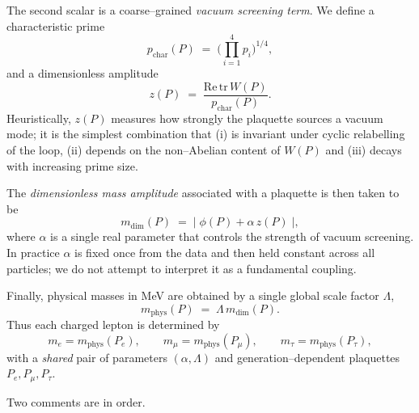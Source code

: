 \documentclass[12pt]{article}
\begin{document}
The second scalar is a coarse--grained \emph{vacuum screening term}.
We define a characteristic prime
\begin{equation}
  p_{\mathrm{char}}(P)
    \;=\; \biggl(\prod_{i=1}^{4} p_i\biggr)^{1/4},
  \label{eq:pchar}
\end{equation}
and a dimensionless amplitude
\begin{equation}
  z(P)
    \;=\; \frac{\mathrm{Re}\,\mathrm{tr}\,W(P)}{p_{\mathrm{char}}(P)}.
  \label{eq:zeta-term}
\end{equation}
Heuristically, $z(P)$ measures how strongly the plaquette sources a
vacuum mode; it is the simplest combination that (i) is invariant under
cyclic relabelling of the loop, (ii) depends on the non--Abelian
content of $W(P)$ and (iii) decays with increasing prime size.

The \emph{dimensionless mass amplitude} associated with a plaquette is
then taken to be
\begin{equation}
  m_{\mathrm{dim}}(P)
    \;=\; \bigl|\;\phi(P) + \alpha\,z(P)\;\bigr|,
  \label{eq:dim-mass}
\end{equation}
where $\alpha$ is a single real parameter that controls the strength of
vacuum screening.  In practice $\alpha$ is fixed once from the data and
then held constant across all particles; we do not attempt to interpret
it as a fundamental coupling.

Finally, physical masses in MeV are obtained by a single global scale
factor $\Lambda$,
\begin{equation}
  m_{\mathrm{phys}}(P)
    \;=\; \Lambda\, m_{\mathrm{dim}}(P).
  \label{eq:phys-mass}
\end{equation}
Thus each charged lepton is determined by
\[
  m_e = m_{\mathrm{phys}}(P_e),\qquad
  m_\mu = m_{\mathrm{phys}}(P_\mu),\qquad
  m_\tau = m_{\mathrm{phys}}(P_\tau),
\]
with a \emph{shared} pair of parameters $(\alpha,\Lambda)$ and
generation--dependent plaquettes $P_e,P_\mu,P_\tau$.

Two comments are in order.
\end{document}
